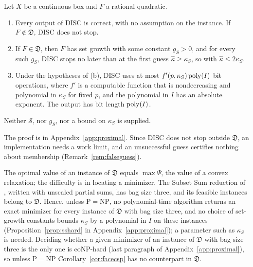\begin{theorem}\label{thm:diagdiscovery}
Let $X$ be a continuous box and $F$ a rational quadratic.
\begin{enumerate}[label=(\alph*)]
\item Every output of DISC is correct, with no assumption on the instance.
If $F\notin\mathfrak D$, DISC does not stop.
\item If $F\in\mathfrak D$, then $F$ has set growth with some constant
$g_S>0$, and for every such $g_S$, DISC stops no later than at the first
guess $\hat\kappa\ge\kappa_S$, so with $\hat\kappa\le2\kappa_S$.
\item Under the hypotheses of (b), DISC uses at most $f'(p,\kappa_S)\operatorname{poly}(I)$
bit operations, where $f'$ is a computable function that is nondecreasing
and polynomial in $\kappa_S$ for fixed $p$, and the polynomial in $I$ has an
absolute exponent. The output has bit length $\operatorname{poly}(I)$.
\end{enumerate}
Neither $\mathcal S$, nor $g_S$, nor a bound on $\kappa_S$ is supplied.
\end{theorem}

The proof is in Appendix~\ref{app:proximal}. Since DISC does not stop outside
$\mathfrak D$, an implementation needs a work limit, and an unsuccessful guess
certifies nothing about membership (Remark~\ref{rem:falseguess}).

The optimal value of an instance of $\mathfrak D$ equals $\max\Psi$, the
value of a convex relaxation; the difficulty is in locating a minimizer. The
Subset Sum reduction of \cite[Remark~2]{DelPiaKhajavirad2026}, written with
unscaled partial sums, has bag size three, and its feasible instances belong
to $\mathfrak D$. Hence, unless $\mathrm P=\mathrm{NP}$, no polynomial-time
algorithm returns an exact minimizer for every instance of $\mathfrak D$ with
bag size three, and no choice of set-growth constants bounds $\kappa_S$ by a
polynomial in $I$ on these instances (Proposition~\ref{prop:sshard} in
Appendix~\ref{app:proximal}); a parameter such as $\kappa_S$ is needed.
Deciding whether a given minimizer of an instance of $\mathfrak D$ with bag
size three is the only one is coNP-hard (last paragraph of
Appendix~\ref{app:proximal}), so
unless $\mathrm P=\mathrm{NP}$ Corollary~\ref{cor:facecsp} has no counterpart
in $\mathfrak D$.
